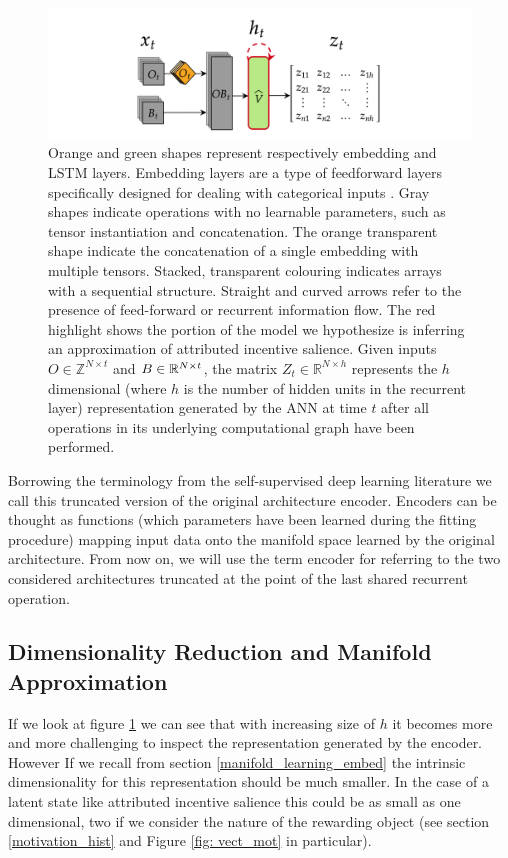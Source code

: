 \begin{figure}[!htb]
  \centering
  \includegraphics[width=\textwidth]{images/chapter_4/representation_extractor.png}
    \caption[\textbf{The procedure for generating latent representations generated by an ANN}]{Orange and green shapes represent respectively embedding and LSTM layers. Embedding layers are a type of feedforward layers specifically designed for dealing with categorical inputs \cite{chollet2015keras}. Gray shapes indicate operations with no learnable parameters, such as tensor instantiation and concatenation. The orange transparent shape indicate the concatenation of a single embedding with multiple tensors. Stacked, transparent colouring indicates arrays with a sequential structure. Straight and curved arrows refer to the presence of feed-forward or recurrent information flow. The red highlight shows the portion of the model we hypothesize is inferring an approximation of attributed incentive salience. Given inputs $O \in \mathbb{Z}^{N \times t}$ and $B \in \mathbb{R}^{N \times t \time 5}$, the matrix $Z_t \in \mathbb{R}^{N \times h}$ represents the $h$ dimensional (where $h$ is the number of hidden units in the recurrent layer) representation generated by the ANN at time $t$ after all operations in its underlying computational graph have been performed.}
    \label{fig: repr_extr}
\end{figure}

Borrowing the terminology from the self-supervised deep learning literature \cite{bengio2017deep} we call this truncated version of the original architecture encoder. Encoders can be thought as functions (which parameters have been learned during the fitting procedure) mapping input data onto the manifold space learned by the original architecture. From now on, we will use the term encoder for referring to the two considered architectures truncated at the point of the last shared recurrent operation.

\subsection{Dimensionality Reduction and Manifold Approximation}
\label{dim_reduction}
If we look at figure \ref{fig: repr_extr} we can see that with increasing size of $h$ it becomes more and more challenging to inspect the representation generated by the encoder. However If we recall from section \ref{manifold_learning_embed} the intrinsic dimensionality for this representation should be much smaller. In the case of a latent state like attributed incentive salience this could be as small as one dimensional, two if we consider the nature of the rewarding object (see section \ref{motivation_hist} and Figure \ref{fig: vect_mot} in particular). 

